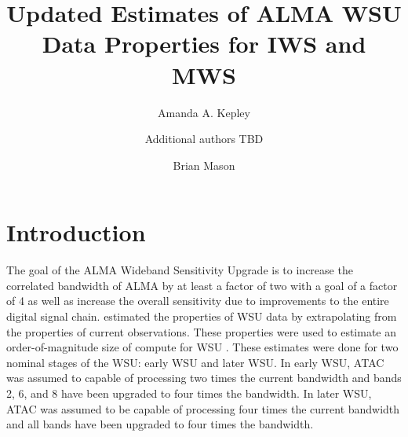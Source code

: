 \documentclass[preprint]{aastex631}
\begin{document}
%

\title{Updated Estimates of ALMA WSU Data Properties for IWS and MWS}


\author{Amanda A. Kepley}

\author{Additional authors TBD}

\author{Brian Mason}





\date{}

\begin{abstract}


\end{abstract}

\section{Introduction} \label{sec:intro}

The goal of the ALMA Wideband Sensitivity Upgrade is to increase the correlated bandwidth of ALMA by at least a factor of two with a goal of a factor of 4 as well as increase the overall sensitivity due to improvements to the entire digital signal chain. \citet{Kepley2024DataProperties} estimated the properties of WSU data by extrapolating from the properties of current observations. These properties were used to estimate an order-of-magnitude size of compute for WSU \citep{Kepley2024DataEstimate}.  These estimates were done for two nominal stages of the WSU: early WSU and later WSU. In early WSU, ATAC was assumed to capable of processing two times the current bandwidth and bands 2, 6, and 8 have been upgraded to four times the bandwidth. In later WSU, ATAC was assumed to be capable of processing four times the current bandwidth and all bands have been upgraded to four times the bandwidth.
\end{document}
